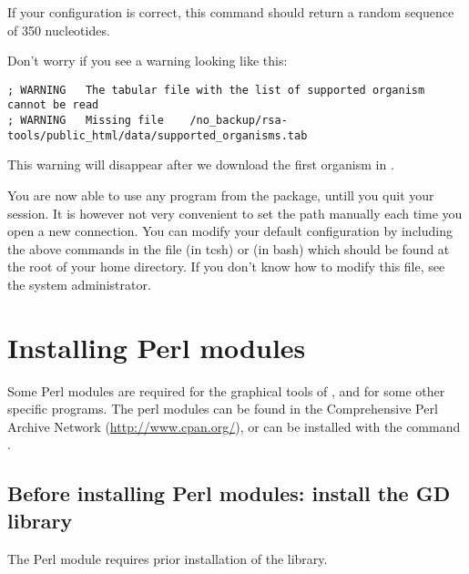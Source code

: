 \documentclass[12pt,a4paper, oneside]{scrreprt} %
\begin{document}
If your configuration is correct, this command should return a random
sequence of 350 nucleotides.

Don't worry if you see a warning looking like this:

\begin{footnotesize}
\begin{verbatim}
; WARNING	The tabular file with the list of supported organism cannot be read
; WARNING	Missing file	/no_backup/rsa-tools/public_html/data/supported_organisms.tab
\end{verbatim}
\end{footnotesize}

This warning will disappear after we download the first organism in
\RSAT.

You are now able to use any program from the \RSAT package, untill you
quit your session. It is however not very convenient to set the path
manually each time you open a new connection. You can modify your
default configuration by including the above commands in the file
 (in tcsh) or  (in bash) which should be
found at the root of your home directory. If you don't know how to
modify this file, see the system administrator.

\chapter{Installing Perl modules}
\label{chap:perl_modules}

Some Perl modules are required for the graphical tools of \RSAT, and
for some other specific programs. The perl modules can be found in the
Comprehensive Perl Archive Network (\url{http://www.cpan.org/}), or
can be installed with the command .

\section{Before installing Perl modules: install the GD library}

The Perl module  requires prior installation of the
 library.
\end{document}
